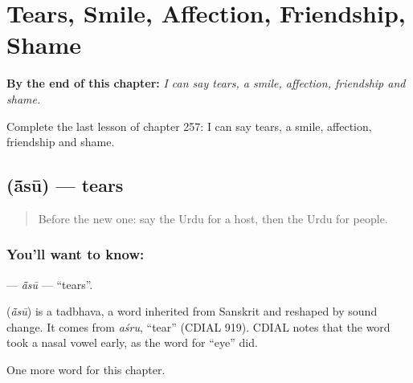 
\chapter{Tears, Smile, Affection, Friendship, Shame}
\label{ch:ur-tears-smile-affection-friendship-shame}

\begin{chapteropening}
\textbf{By the end of this chapter:} \emph{I can say tears, a smile, affection, friendship and shame.}

Complete the last lesson of chapter 257: I can say tears, a smile, affection, friendship and shame.
\end{chapteropening}

\section[\texorpdfstring{\ur{آنسو} (ā̃sū)}{آنسو (ā̃sū)}]{ (ā̃sū) — tears}

\label{lesson:UR-C257-asu}



\begin{quote}
Before the new one: say the Urdu for a host, then the Urdu for people.
\end{quote}

\subsection*{You'll want to know: }
\textbf{} — \emph{ā̃sū} — \textquotedblleft{}tears\textquotedblright{}.

\begin{cousinweb}
\textbf{} (\emph{ā̃sū}) is a tadbhava, a word inherited from Sanskrit and reshaped by sound change. It comes from \emph{aśru}, \textquotedblleft{}tear\textquotedblright{} (CDIAL 919). CDIAL notes that the word took a nasal vowel early, as the word for \textquotedblleft{}eye\textquotedblright{} did.
\end{cousinweb}

\begin{grammarlens}[title={What you've built}]
One more word for this chapter.
\end{grammarlens}

